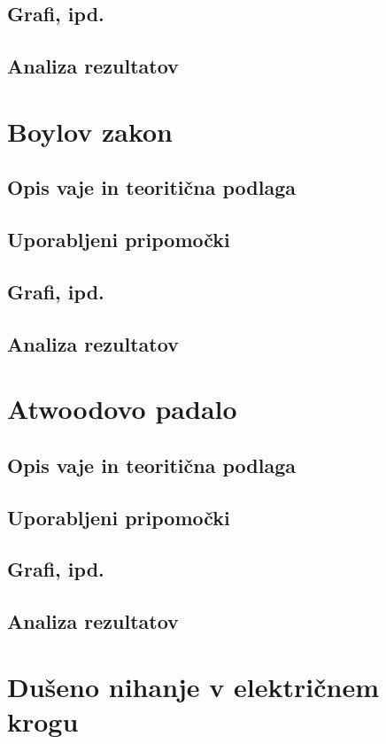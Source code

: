 \documentclass[12pt]{article}
\begin{document}
    \subsection*{Grafi, ipd.}
    \subsection*{Analiza rezultatov}

\newpage
\section{Boylov zakon}
    \subsection*{Opis vaje in teoritična podlaga}
    \subsection*{Uporabljeni pripomočki}
    \subsection*{Grafi, ipd.}
    \subsection*{Analiza rezultatov}

\newpage
\section{Atwoodovo padalo}
    \subsection*{Opis vaje in teoritična podlaga}
    \subsection*{Uporabljeni pripomočki}
    \subsection*{Grafi, ipd.}
    \subsection*{Analiza rezultatov}

\newpage
\section{Dušeno nihanje v električnem krogu}
\end{document}
